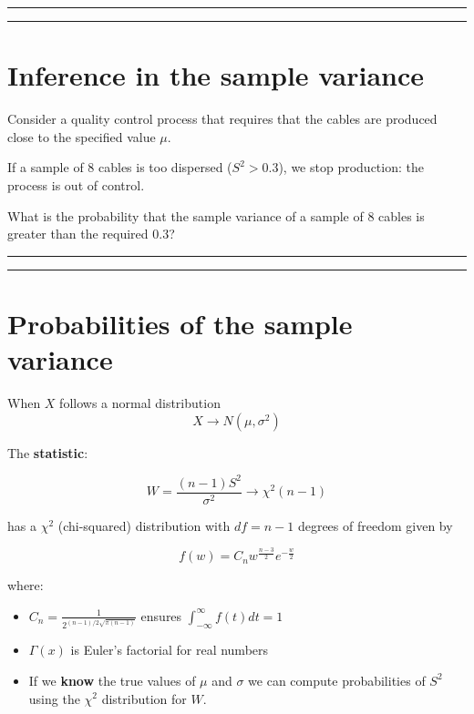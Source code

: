 \documentclass[
]{book}
\begin{document}
\begin{center}\rule{0.5\linewidth}{0.5pt}\end{center}

\begin{center}\rule{0.5\linewidth}{0.5pt}\end{center}

\hypertarget{inference-in-the-sample-variance}{%
\section{Inference in the sample variance}\label{inference-in-the-sample-variance}}

Consider a quality control process that requires that the cables are produced close to the specified value \(\mu\).

If a sample of \(8\) cables is too dispersed (\(S^2>0.3\)), we stop production: the process is out of control.

What is the probability that the sample variance of a sample of \(8\) cables is greater than the required \(0.3\)?

\begin{center}\rule{0.5\linewidth}{0.5pt}\end{center}

\begin{center}\rule{0.5\linewidth}{0.5pt}\end{center}

\hypertarget{probabilities-of-the-sample-variance}{%
\section{Probabilities of the sample variance}\label{probabilities-of-the-sample-variance}}

When \(X\) follows a normal distribution
\[X \rightarrow N(\mu, \sigma^2)\]

The \textbf{statistic}:

\[W=\frac{(n-1)S^2}{\sigma^2} \rightarrow \chi^2(n-1)\]

has a \(\chi^2\) (chi-squared) distribution with \(df=n-1\) degrees of freedom given by

\[f(w)=C_n  w^{\frac{n-3}{2}} e^{-\frac{w}{2}}\]

where:

\begin{itemize}
\item
  \(C_n=\frac{1}{2^{(n-1)/2\sqrt{\pi(n-1)}}}\) ensures \(\int_{-\infty}^{\infty} f(t)dt=1\)
\item
  \(\Gamma(x)\) is Euler's factorial for real numbers
\item
  If we \textbf{know} the true values of \(\mu\) and \(\sigma\) we can compute probabilities of \(S^2\) using the \(\chi^2\) distribution for \(W\).
\end{itemize}
\end{document}
